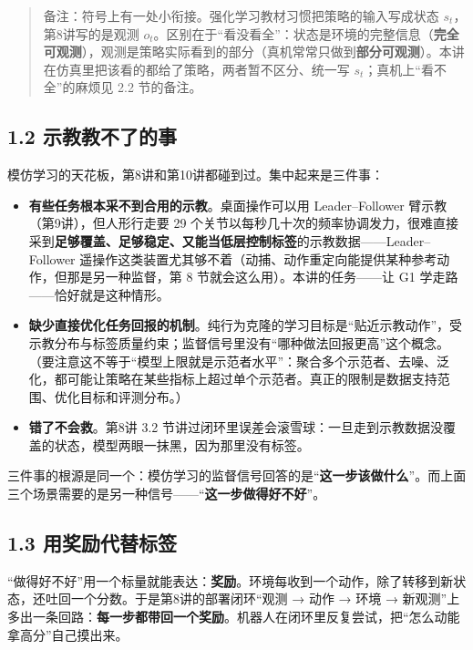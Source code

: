 \documentclass[
  chinese,
]{ctexart}
\providecommand{\tightlist}{%
  \setlength{\itemsep}{0pt}\setlength{\parskip}{0pt}}
\begin{document}
\begin{quote}
备注：符号上有一处小衔接。强化学习教材习惯把策略的输入写成状态
\(s_t\)，第8讲写的是观测
\(o_t\)。区别在于``看没看全''：状态是环境的完整信息（\textbf{完全可观测}），观测是策略实际看到的部分（真机常常只做到\textbf{部分可观测}）。本讲在仿真里把该看的都给了策略，两者暂不区分、统一写
\(s_t\)；真机上``看不全''的麻烦见 2.2 节的备注。
\end{quote}

\subsection{1.2
示教教不了的事}\label{ux793aux6559ux6559ux4e0dux4e86ux7684ux4e8b}

模仿学习的天花板，第8讲和第10讲都碰到过。集中起来是三件事：

\begin{itemize}
\tightlist
\item
  \textbf{有些任务根本采不到合用的示教}。桌面操作可以用 Leader--Follower
  臂示教（第9讲），但人形行走要 29
  个关节以每秒几十次的频率协调发力，很难直接采到\textbf{足够覆盖、足够稳定、又能当低层控制标签}的示教数据------Leader--Follower
  遥操作这类装置尤其够不着（动捕、动作重定向能提供某种参考动作，但那是另一种监督，第
  8 节就会这么用）。本讲的任务------让 G1 学走路------恰好就是这种情形。
\item
  \textbf{缺少直接优化任务回报的机制}。纯行为克隆的学习目标是``贴近示教动作''，受示教分布与标签质量约束；监督信号里没有``哪种做法回报更高''这个概念。（要注意这不等于``模型上限就是示范者水平''：聚合多个示范者、去噪、泛化，都可能让策略在某些指标上超过单个示范者。真正的限制是数据支持范围、优化目标和评测分布。）
\item
  \textbf{错了不会救}。第8讲 3.2
  节讲过闭环里误差会滚雪球：一旦走到示教数据没覆盖的状态，模型两眼一抹黑，因为那里没有标签。
\end{itemize}

三件事的根源是同一个：模仿学习的监督信号回答的是``\textbf{这一步该做什么}''。而上面三个场景需要的是另一种信号------``\textbf{这一步做得好不好}''。

\subsection{1.3
用奖励代替标签}\label{ux7528ux5956ux52b1ux4ee3ux66ffux6807ux7b7e}

``做得好不好''用一个标量就能表达：\textbf{奖励}。环境每收到一个动作，除了转移到新状态，还吐回一个分数。于是第8讲的部署闭环``观测
→ 动作 → 环境 →
新观测''上多出一条回路：\textbf{每一步都带回一个奖励}。机器人在闭环里反复尝试，把``怎么动能拿高分''自己摸出来。
\end{document}
